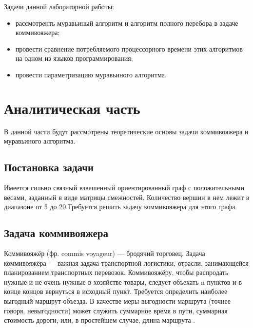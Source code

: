 \documentclass[a4paper, 14pt]{article}
\begin{document}
        Задачи данной лабораторной работы: \begin{itemize}
        \item рассмотренть муравьиный алгоритм и алгоритм полного перебора в задаче коммивояжера;
        \item провести сравнение потребляемого процессорного времени этих алгоритмов на одном из языков программирования;
        \item провести параметризацию муравьиного алгоритма.
        \end{itemize}
        

        \label{sec:intro}

    	\newpage
        \section{Аналитическая часть}
		\parindent=1cm
		
		В данной части будут рассмотрены теоретические основы задачи коммивояжера и муравьиного алгоритма. 
		
\subsection{Постановка задачи}\label{zad} 
	Имеется сильно связный взвешенный ориентированный граф \cite{diskr} с положительными весами, заданный в виде матрицы смежностей. Количество вершин в нем лежит в диапазоне от 5 до 20.Требуется решить задачу коммивояжера для этого графа. 
        \subsection{Задача коммивояжера}
        Коммивояжёр (фр. commis voyageur) — бродячий торговец. Задача коммивояжёра — важная задача транспортной логистики, отрасли, занимающейся планированием транспортных перевозок. Коммивояжёру, чтобы распродать нужные и не очень нужные в хозяйстве товары, следует объехать n пунктов и в конце концов вернуться в исходный пункт. Требуется определить наиболее выгодный маршрут объезда. В качестве меры выгодности маршрута (точнее говоря, невыгодности) может служить суммарное время в пути, суммарная стоимость дороги, или, в простейшем случае, длина маршрута \cite{commi2}.
\end{document}
